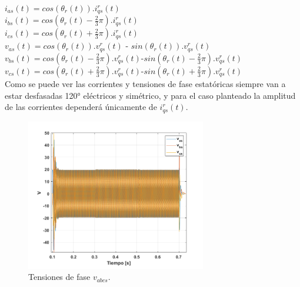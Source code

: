 \documentclass[10pt]{article}
\begin{document}
\begin{itemize}
	$i_{as}(t)=cos(\theta_{r}(t)).i^{r}_{qs}(t)$\\
	$i_{bs}(t)=cos(\theta_{r}(t)-\frac{2}{3}\pi).i^{r}_{qs}(t)$\\
	$i_{cs}(t)=cos(\theta_{r}(t)+\frac{2}{3}\pi).i^{r}_{qs}(t)$\\
	$v_{as}(t)=cos(\theta_{r}(t)).v^{r}_{qs}(t)$ - $ sin(\theta_{r}(t)). v^{r}_{qs}(t)$\\
	$v_{bs}(t)=cos(\theta_{r}(t)-\frac{2}{3}\pi).v^{r}_{qs}(t)$-$sin(\theta_{r}(t)-\frac{2}{3}\pi). v^{r}_{qs}(t)$\\
	$v_{cs}(t)=cos(\theta_{r}(t)+\frac{2}{3}\pi).v^{r}_{qs}(t)$-$sin(\theta_{r}(t)+\frac{2}{3}\pi). v^{r}_{qs}(t)$\\
	
	Como se puede ver las corrientes y tensiones de fase estatóricas siempre van a estar desfasadas 120° eléctricos y simétrico, y para el caso planteado la amplitud de las corrientes dependerá únicamente de $i^{r}_{qs}(t)$.
	\begin{figure}[h!]
	\centering
	\includegraphics[width=0.7\textwidth]{v.png}
	\caption{\label{fig:v} Tensiones de fase $v_{abcs}$.}
	\end{figure}
	

\end{itemize}
\end{document}
